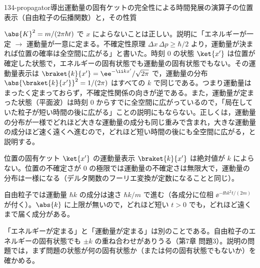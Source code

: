 \documentclass[uplatex,dvipdfmx,a4paper,11pt]{jsarticle}
\begin{document}
\begin{mondai}{134-propagator}{導出}{運動量の固有ケットの完全性による時間発展の演算子の位置表示（自由粒子の伝播関数）と，その性質}
\begin{kotaeran}
   $\abs{K}^{2}=m/(2\pi\hbar t)$ で $x$ によらないことは正しい。説明に「エネルギーが一定 $\to$ 運動量が一意に定まる。不確定性原理 $\Delta x\,\Delta p\ge\hbar/2$ より，運動量が決まれば位置の確率は全空間に広がる」と書いた。時刻 $0$ の状態 $\ket{x'}$ は位置が確定した状態で，エネルギーの固有状態でも運動量の固有状態でもない。その運動量表示は $\braket{k}{x'}=\ee^{-\ii kx'}/\sqrt{2\pi}$ で，運動量の分布 $\abs{\braket{k}{x'}}^{2}=1/(2\pi)$ はすべての $k$ で同じである。つまり運動量はまったく定まっておらず，不確定性関係の向きが逆である。また，運動量が定まった状態（平面波）は時刻 $0$ からすでに全空間に広がっているので，「局在していた粒子が短い時間の後に広がる」ことの説明にもならない。正しくは，運動量の分布が一様でどれほど大きな運動量の成分も同じ重みで含まれ，大きな運動量の成分ほど速く遠くへ進むので，どれほど短い時間の後にも全空間に広がる，と説明する。
\end{kotaeran}
\begin{rikai}
  \item 位置の固有ケット $\ket{x'}$ の運動量表示 $\braket{k}{x'}$ は絶対値が $k$ によらない。位置の不確定さが $0$ の極限では運動量の不確定さは無限大で，運動量の分布は一様になる（デルタ関数のフーリエ変換が定数になることと同じ）。
  \item 自由粒子では運動量 $\hbar k$ の成分は速さ $\hbar k/m$ で進む（各成分に位相 $\ee^{-\ii\hbar k^{2}t/(2m)}$ が付く）。$\abs{k}$ に上限が無いので，どれほど短い $t>0$ でも，どれほど遠くまで届く成分がある。
  \item 「エネルギーが定まる」と「運動量が定まる」は別のことである。自由粒子のエネルギーの固有状態でも $\pm k$ の重ね合わせがありうる（第7章 問題3）。説明の問題では，まず問題の状態が何の固有状態か（または何の固有状態でもないか）を確かめる。
\end{rikai}
\end{mondai}
\end{document}
